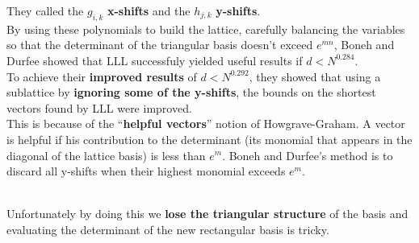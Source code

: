 \documentclass[a4paper,11pt]{article}
\begin{document}
They called the $g_{i,k}$ \textbf{x-shifts} and the $h_{j,k}$ \textbf{y-shifts}.\\

By using these polynomials to build the lattice, carefully balancing the variables so that the determinant of the triangular basis doesn't exceed $e^{mn}$, Boneh and Durfee showed that LLL successfuly yielded useful results if $d < N^{0.284}$.\\

To achieve their \textbf{improved results} of $d < N^{0.292}$, they showed that using a sublattice by \textbf{ignoring some of the y-shifts}, the bounds on the shortest vectors found by LLL were improved.\\
This is because of the ``\textbf{helpful vectors}'' notion of Howgrave-Graham. A vector is helpful if his contribution to the determinant (its monomial that appears in the diagonal of the lattice basis) is less than $e^m$. Boneh and Durfee's method is to discard all y-shifts when their highest monomial exceeds $e^m$.

\\

Unfortunately by doing this we \textbf{lose the triangular structure} of the basis and evaluating the determinant of the new rectangular basis is tricky.
\end{document}
